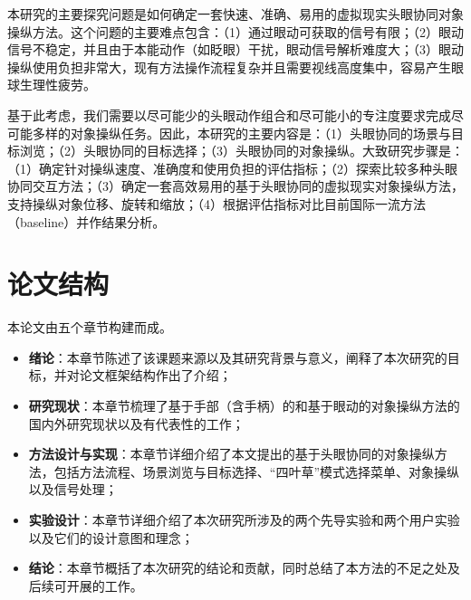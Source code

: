 本研究的主要探究问题是如何确定一套快速、准确、易用的虚拟现实头眼协同对象操纵方法。这个问题的主要难点包含：（1）通过眼动可获取的信号有限；（2）眼动信号不稳定，并且由于本能动作（如眨眼）干扰，眼动信号解析难度大；（3）眼动操纵使用负担非常大，现有方法操作流程复杂并且需要视线高度集中，容易产生眼球生理性疲劳。

基于此考虑，我们需要以尽可能少的头眼动作组合和尽可能小的专注度要求完成尽可能多样的对象操纵任务。因此，本研究的主要内容是：（1）头眼协同的场景与目标浏览；（2）头眼协同的目标选择；（3）头眼协同的对象操纵。大致研究步骤是：（1）确定针对操纵速度、准确度和使用负担的评估指标；（2）探索比较多种头眼协同交互方法；（3）确定一套高效易用的基于头眼协同的虚拟现实对象操纵方法，支持操纵对象位移、旋转和缩放；（4）根据评估指标对比目前国际一流方法（baseline）并作结果分析。

\section{论文结构}

本论文由五个章节构建而成。

\begin{itemize}
	\item {\bf 绪论}：本章节陈述了该课题来源以及其研究背景与意义，阐释了本次研究的目标，并对论文框架结构作出了介绍；
	\item {\bf 研究现状}：本章节梳理了基于手部（含手柄）的和基于眼动的对象操纵方法的国内外研究现状以及有代表性的工作；
	\item {\bf 方法设计与实现}：本章节详细介绍了本文提出的基于头眼协同的对象操纵方法，包括方法流程、场景浏览与目标选择、“四叶草”模式选择菜单、对象操纵以及信号处理；
	\item {\bf 实验设计}：本章节详细介绍了本次研究所涉及的两个先导实验和两个用户实验以及它们的设计意图和理念；
	\item {\bf 结论}：本章节概括了本次研究的结论和贡献，同时总结了本方法的不足之处及后续可开展的工作。
\end{itemize}
